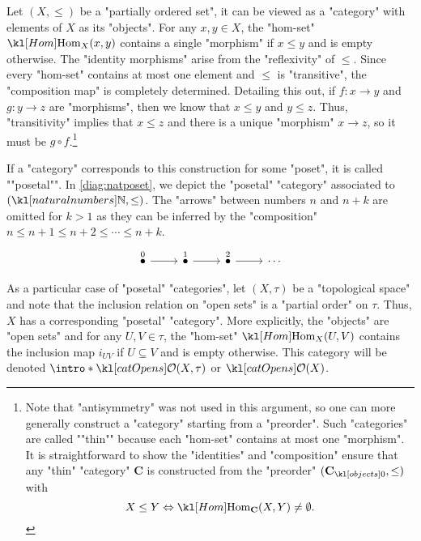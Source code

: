 \documentclass[main.tex]{subfiles}
\begin{document}
\begin{exmp}
	Let $(X, \leq)$ be a "partially ordered set", it can be viewed as a "category" with elements of $X$ as its "objects". For any $x,y \in X$, the "hom-set" $\Hom_X(x,y)$ contains a single "morphism" if $x \leq y$ and is empty otherwise. The "identity morphisms" arise from the "reflexivity" of $\leq$. Since every "hom-set" contains at most one element and $\leq$ is "transitive", the "composition map" is completely determined. Detailing this out, if $f:x \rightarrow y$ and $g: y \rightarrow z$ are "morphisms", then we know that $x \leq y$ and $y\leq z$. Thus, "transitivity" implies that $x\leq z$ and there is a unique "morphism" $x \rightarrow z$, so it must be $g \circ f$.\footnote{Note that "antisymmetry" was not used in this argument, so one can more generally construct a "category" starting from a "preorder". \AP Such "categories" are called ""thin"" because each "hom-set" contains at most one "morphism". It is straightforward to show the "identities" and "composition" ensure that any "thin" "category" $\mathbf{C}$ is constructed from the "preorder" $(\obj{\mathbf{C}}, \leq)$ with \[X \leq Y \Leftrightarrow \Hom_{\mathbf{C}}(X,Y) \neq \emptyset.\]}
	
	\AP If a "category" corresponds to this construction for some "poset", it is called ""posetal"". In \eqref{diag:natposet}, we depict the "posetal" "category" associated to $(\N, \leq)$. The "arrows" between numbers $n$ and $n+k$ are omitted for $k>1$ as they can be inferred by the "composition" $n \leq n+1 \leq n+2 \leq \cdots \leq n+k$.
	\begin{equation}\label{diag:natposet}
		\begin{tikzcd}
			\stackrel{0}{\bullet} \arrow[r] & \stackrel{1}{\bullet} \arrow[r] & \stackrel{2}{\bullet} \arrow[r] & \cdots
		\end{tikzcd}
	\end{equation}
	
	As a particular case of "posetal" "categories", let $(X, \tau)$ be a "topological space" and note that the inclusion relation on "open sets" is a "partial order" on $\tau$. Thus, $X$ has a corresponding "posetal" "category". More explicitly, the "objects" are "open sets" and for any $U, V \in \tau$, the "hom-set" $\Hom_X(U,V)$ contains the inclusion map $i_{UV}$ if $U\subseteq V$ and is empty otherwise. \AP This category will be denoted $\intro*\catOpens(X,\tau)$ or $\catOpens(X)$.
\end{exmp}
\end{document}
